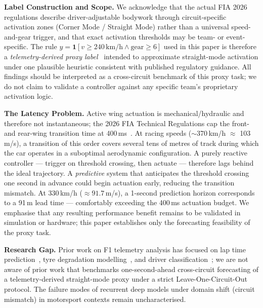 \documentclass[conference,a4paper]{IEEEtran}
\begin{document}
\textbf{Label Construction and Scope.}
We acknowledge that the actual FIA 2026 regulations describe driver-adjustable
bodywork through circuit-specific activation zones (Corner Mode / Straight Mode)
rather than a universal speed-and-gear trigger, and that exact activation thresholds
may be team- or event-specific.
The rule $y = \mathbf{1}[v \geq 240\,\text{km/h} \wedge \text{gear} \geq 6]$
used in this paper is therefore a \emph{telemetry-derived proxy label}~\cite{ref_fia2026}
intended to approximate straight-mode activation under one plausible heuristic
consistent with published regulatory guidance.
All findings should be interpreted as a cross-circuit benchmark of this proxy task;
we do not claim to validate a controller against any specific team's proprietary
activation logic.

\textbf{The Latency Problem.}
Active wing actuation is mechanical/hydraulic and therefore not instantaneous; the 2026
FIA Technical Regulations cap the front- and rear-wing transition time at
400\,ms~\cite{ref_fia2026}.
At racing speeds ($\sim$370\,km/h $\approx$ 103\,m/s), a transition of this order covers
several tens of metres of track during which the car operates in a suboptimal aerodynamic
configuration.
A purely reactive controller — trigger on threshold crossing, then actuate — therefore
lags behind the ideal trajectory.
A \emph{predictive} system that anticipates the threshold crossing one second in advance
could begin actuation early, reducing the transition mismatch.
At 330\,km/h ($\approx 91.7$\,m/s), a 1-second prediction horizon corresponds to a
91\,m lead time — comfortably exceeding the 400\,ms actuation budget.
We emphasise that any resulting performance benefit remains to be validated in simulation
or hardware; this paper establishes only the forecasting feasibility of the proxy task.

\textbf{Research Gap.}
Prior work on F1 telemetry analysis has focused on lap time prediction~\cite{ref_laptime},
tyre degradation modelling~\cite{ref_tyre}, and driver classification~\cite{ref_driver};
we are not aware of prior work that benchmarks one-second-ahead cross-circuit forecasting
of a telemetry-derived straight-mode proxy under a strict Leave-One-Circuit-Out protocol.
The failure modes of recurrent deep models under domain shift (circuit mismatch) in
motorsport contexts remain uncharacterised.
\end{document}
